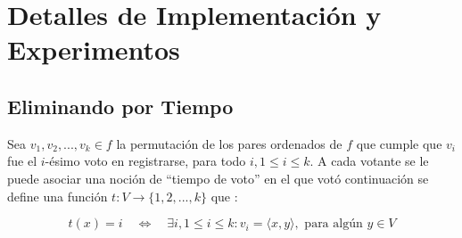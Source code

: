 \chapter{Detalles de Implementación y Experimentos}\label{chapter:implementation}
\section{Eliminando por Tiempo}
Sea $v_1, v_2, ..., v_k \in f$ la permutaci\'on de los pares ordenados de $f$ que cumple que $v_i$ fue el $i$-\'esimo voto en registrarse, para todo $i, 1 \leq i \leq k$. A cada votante se le puede asociar una noci\'on de ``tiempo de voto'' en el que vot\'o continuaci\'on se define una funci\'on $t: V \rightarrow \{1, 2, ..., k\}$ que :

$$
t(x) = i \quad \Leftrightarrow \quad \exists i, 1 \leq i \leq k: v_i = \langle x, y \rangle, \text{ para alg\'un } y \in V 
$$